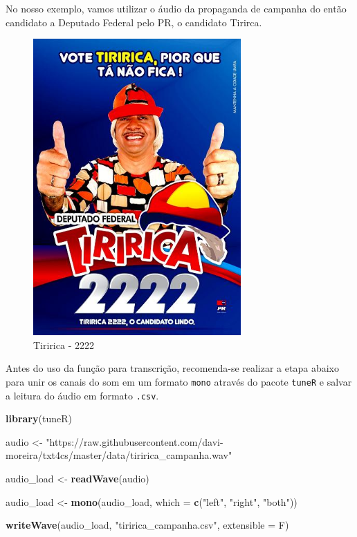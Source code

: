 \documentclass[]{book}
\newenvironment{Shaded}{\begin{snugshade}}{\end{snugshade}}
\newcommand{\DataTypeTok}[1]{\textcolor[rgb]{0.13,0.29,0.53}{#1}}
\newcommand{\KeywordTok}[1]{\textcolor[rgb]{0.13,0.29,0.53}{\textbf{#1}}}
\newcommand{\NormalTok}[1]{#1}
\newcommand{\StringTok}[1]{\textcolor[rgb]{0.31,0.60,0.02}{#1}}
\begin{document}
No nosso exemplo, vamos utilizar o áudio da propaganda de campanha do então candidato
a Deputado Federal pelo PR, o candidato Tirirca.

\begin{figure}
\centering
\includegraphics[width=3.125in,height=\textheight]{images/santinho-tiririca.jpg}
\caption{Tiririca - 2222}
\end{figure}

Antes do uso da função para transcrição, recomenda-se realizar a etapa abaixo para
unir os canais do som em um formato \texttt{mono} através do pacote \texttt{tuneR} e salvar a leitura
do áudio em formato \texttt{.csv}.

\begin{Shaded}
\begin{Highlighting}[]
\KeywordTok{library}\NormalTok{(tuneR)}

\NormalTok{audio <-}\StringTok{ "https://raw.githubusercontent.com/davi-moreira/txt4cs/master/data/tiririca_campanha.wav"}

\NormalTok{audio_load <-}\StringTok{ }\KeywordTok{readWave}\NormalTok{(audio)}

\NormalTok{audio_load <-}\StringTok{ }\KeywordTok{mono}\NormalTok{(audio_load, }\DataTypeTok{which =} \KeywordTok{c}\NormalTok{(}\StringTok{"left"}\NormalTok{, }\StringTok{"right"}\NormalTok{, }\StringTok{"both"}\NormalTok{))}

\KeywordTok{writeWave}\NormalTok{(audio_load, }\StringTok{"tiririca_campanha.csv"}\NormalTok{, }\DataTypeTok{extensible =}\NormalTok{ F)}
\end{Highlighting}
\end{Shaded}
\end{document}

